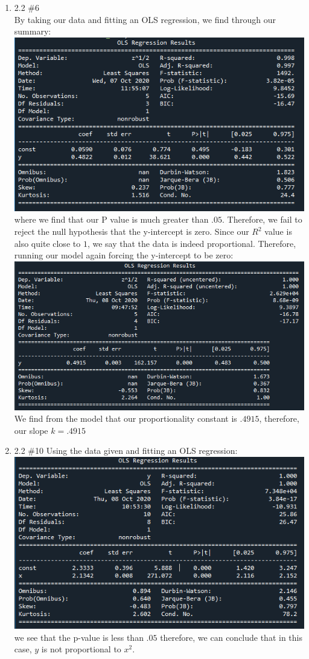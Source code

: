 \documentclass[12pt,letterpaper]{article}
\begin{document}
\begin{enumerate}
\item 2.2 \#6\\
By taking our data and fitting an OLS regression, we find through our summary: 
\includegraphics{2.2 6a.png}\\
where we find that our P value is much greater than $.05$. Therefore, we fail to 
reject the null hypothesis that the y-intercept is zero. Since our $R^2$ value is also
quite close to $1$, we say that the data is indeed proportional. Therefore, running our 
model again forcing the y-intercept to be zero: \\
\includegraphics{2.2 6b.png}
We find from the model that our proportionality constant is $.4915$, therefore, our slope
$k = .4915$

\item  2.2 \#10
Using the data given and fitting an OLS regression: \\
\includegraphics{2.2 10a.png}\\
we see that the p-value is less than $.05$ therefore, we can conclude that in this case, 
$y$ is not proportional to $x^2$. 


\end{enumerate}
\end{document}
